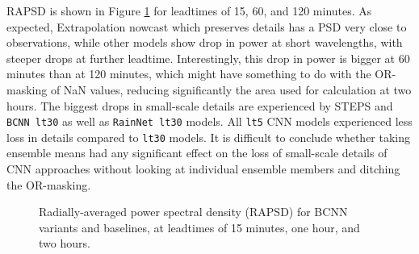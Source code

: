 RAPSD is shown in Figure \ref{fig:rapsd} for leadtimes of 15, 60, and 120 minutes. As expected, Extrapolation nowcast which preserves details has a PSD very close to observations, while other models show drop in power at short wavelengths, with steeper drops at further leadtime. Interestingly, this drop in power is bigger at 60 minutes than at 120 minutes, which might have something to do with the OR-masking of NaN values, reducing significantly the area used for calculation at two hours. The biggest drops in small-scale details are experienced by STEPS and \texttt{BCNN lt30} as well as \texttt{RainNet lt30} models. All \texttt{lt5} CNN models experienced less loss in details compared to \texttt{lt30} models. It is difficult to conclude whether taking ensemble means had any significant effect on the loss of small-scale details of CNN approaches without looking at individual ensemble members and ditching the OR-masking.

\begin{figure}[H]
	\centering
	\caption{Radially-averaged power spectral density (RAPSD) for BCNN variants and baselines, at leadtimes of 15 minutes, one hour, and two hours.}
	\label{fig:rapsd}
\end{figure}

